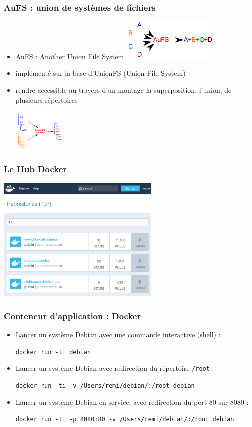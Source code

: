 \begin{frame}
\frametitle{AuFS : union de systèmes de fichiers\cite{AuFS}}
\begin{itemize}
\item AuFS : Another Union File System
\includegraphics[height=2cm]{../illustration/AuFS.png}
\item implémenté sur la base d’UnionFS (Union File System)
\item rendre accessible au travers d’un montage la superposition, l’union, de plusieurs répertoires

\includegraphics[height=2cm]{../illustration/AuFS-Exemples.png}
\end{itemize}

\end{frame}

\begin{frame}
\frametitle{Le Hub Docker}
\includegraphics[height=6cm]{../illustration/DockerHub.png}
\end{frame}

\begin{frame}
\frametitle{Conteneur d'application : Docker}
\begin{itemize}
\item Lancer un système Debian avec une commande interactive (shell) :

\texttt{docker run -ti debian}
\item Lancer un système Debian avec redirection du répertoire \texttt{/root} :

\texttt{docker run -ti -v /Users/remi/debian/:/root debian}
\item Lancer un système Debian en service, avec redirection du port 80 sur 8080 :

\texttt{docker run -ti -p 8080:80 -v /Users/remi/debian/:/root debian}
\end{itemize}
\end{frame}


